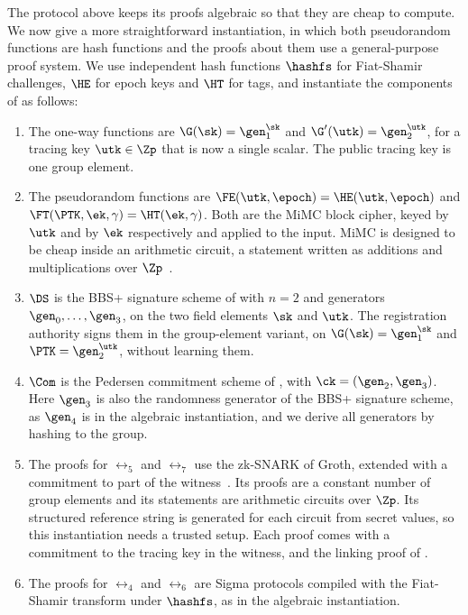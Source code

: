 The protocol above keeps its proofs algebraic so that they are cheap to compute.
We now give a more straightforward instantiation, in which both pseudorandom
functions are hash functions and the proofs about them use a general-purpose
proof system. We use independent hash functions
$\hashfs$ for Fiat-Shamir challenges, $\HE$ for epoch keys and $\HT$ for tags,
and instantiate the components of  as follows:
%
\begin{enumerate}

  \item The one-way functions are $\G(\sk) = \gen_1^{\sk}$ and $\G'(\utk) =
\gen_2^{\utk}$, for a tracing key $\utk \in \Zp$ that is now a single scalar.
The public tracing key is one group element.

  \item The pseudorandom functions are $\FE(\utk,\epoch) = \HE(\utk,\epoch)$ and
$\FT(\PTK,\ek,\gamma) = \HT(\ek,\gamma)$. Both are the MiMC block cipher, keyed
by $\utk$ and by $\ek$ respectively and applied to the input. MiMC is designed
to be cheap inside an arithmetic circuit, a statement written as additions and
multiplications over $\Zp$~\cite{AC:AGRRT16}.

  \item $\DS$ is the BBS+ signature scheme of  with $n = 2$ and
generators $\gen_0, \ldots, \gen_3$, on the two field elements $\sk$ and
$\utk$. The registration authority signs them in the group-element variant, on
$\G(\sk) = \gen_1^{\sk}$ and $\PTK = \gen_2^{\utk}$, without learning them.

  \item $\Com$ is the Pedersen commitment scheme of , with
$\ck = (\gen_2, \gen_3)$. Here $\gen_3$ is also the randomness generator of
the BBS+ signature scheme, as $\gen_4$ is in the algebraic instantiation, and we
derive all generators by hashing to the group.

  \item The proofs for $\rel_5$ and $\rel_7$ use the zk-SNARK of Groth,
extended with a commitment to part of the
witness~\cite{EC:Groth16,CCS:BelSolBeg23}. Its proofs are a constant number of
group elements and its statements are arithmetic circuits over $\Zp$. Its
structured reference string is generated for each circuit from secret values,
so this instantiation needs a trusted setup. Each proof comes with a commitment
to the tracing key in the witness, and the linking proof of
.

  \item The proofs for $\rel_4$ and $\rel_6$ are Sigma protocols compiled with
the Fiat-Shamir transform under $\hashfs$, as in the algebraic instantiation.

\end{enumerate}

